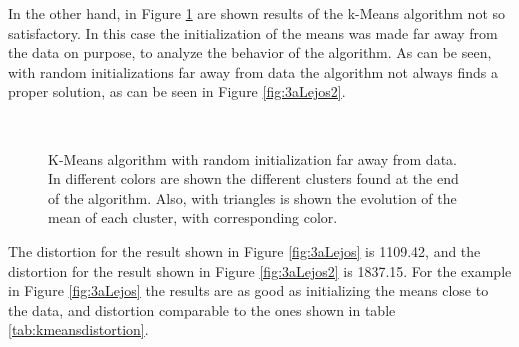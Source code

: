 \documentclass[12pt]{article}
\begin{document}
In the other hand, in Figure \ref{fig:3aLejos_km} are shown results of the k-Means algorithm not so satisfactory. In this case the initialization of the means was made far away from the data on purpose, to analyze the behavior of the algorithm. As can be seen, with random initializations far away from data the algorithm not always finds a proper solution, as can be seen in Figure \ref{fig:3aLejos2}.
\begin{figure} [h!]
\centering
   \\
  \caption{K-Means algorithm with random initialization far away from data. In different colors are shown the different clusters found at the end of the algorithm. Also, with triangles is shown the evolution of the mean of each cluster, with corresponding color.} 
  \label{fig:3aLejos_km}
  \vspace{10pt}
\end{figure}

The distortion for the result shown in Figure \ref{fig:3aLejos} is 1109.42, and the distortion for the result shown in Figure \ref{fig:3aLejos2} is 1837.15. For the example in Figure \ref{fig:3aLejos} the results are as good as initializing the means close to the data, and distortion comparable to the ones shown in table \ref{tab:kmeansdistortion}.
\end{document}
